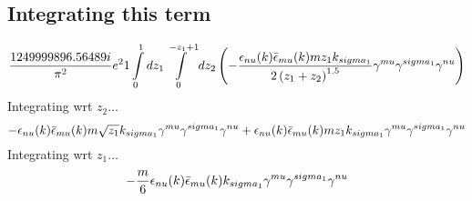 \subsection*{Integrating this term}
\begin{dmath}\frac{1249999896.56489 i}{\pi^{2}} e^{2}1\int\limits_{ 0 }^{ 1 } d{ z_{ 1 } }\int\limits_{ 0 }^{ - { z_{ 1 } } + 1 } d{ z_{ 2 } }\left(- \frac{\epsilon_{ \\nu }({ k }) \bar{\epsilon}_{ \\mu }({ k }) m { z_{ 1 } } { { k }_{ \\sigma_1 } }}{2 \left({ z_{ 1 } } + { z_{ 2 } }\right)^{1.5}} { \gamma^{ \\mu } } { \gamma^{ \\sigma_1 } } { \gamma^{ \\nu } }\right)\end{dmath}
Integrating wrt ${ z_{ 2 } }$...
\begin{dmath}- \epsilon_{ \\nu }({ k }) \bar{\epsilon}_{ \\mu }({ k }) m \sqrt{{ z_{ 1 } }} { { k }_{ \\sigma_1 } } { \gamma^{ \\mu } } { \gamma^{ \\sigma_1 } } { \gamma^{ \\nu } } + \epsilon_{ \\nu }({ k }) \bar{\epsilon}_{ \\mu }({ k }) m { z_{ 1 } } { { k }_{ \\sigma_1 } } { \gamma^{ \\mu } } { \gamma^{ \\sigma_1 } } { \gamma^{ \\nu } }\end{dmath}
Integrating wrt ${ z_{ 1 } }$...
\begin{dmath}- \frac{m}{6} \epsilon_{ \\nu }({ k }) \bar{\epsilon}_{ \\mu }({ k }) { { k }_{ \\sigma_1 } } { \gamma^{ \\mu } } { \gamma^{ \\sigma_1 } } { \gamma^{ \\nu } }\end{dmath}
